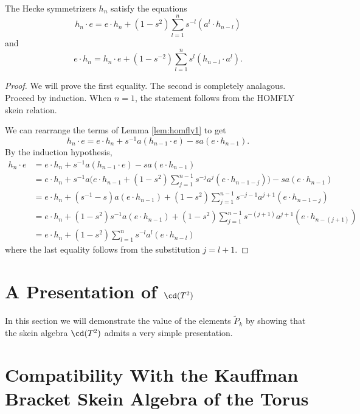 \begin{theorem} \label{prop:homfly2}
The Hecke symmetrizers $h_n$ satisfy the equations
\[
h_n \cdot e = e \cdot h_n + ( 1 - s^2 ) \sum_{l=1}^{n} s^{-l} ( a^l \cdot h_{n-l} )
\]
and
\[
e \cdot h_n = h_n \cdot e + (1 - s^{-2} ) \sum_{l=1}^{n} s^l ( h_{n-l} \cdot a^l ).
\]
\end{theorem}
\begin{proof}
We will prove the first equality. The second is completely analagous. Proceed by induction. When $n=1$, the statement follows from the HOMFLY skein relation. 

We can rearrange the terms of Lemma \ref{lem:homfly1} to get
\begin{equation} \label{eq:homfly1b}
h_n \cdot e = e \cdot h_n + s^{-1} a ( h_{n-1} \cdot e ) - s a ( e \cdot h_{n-1} ).
\end{equation}
By the induction hypothesis,
\begin{align*}
h_n \cdot e & = e \cdot h_n + s^{-1} a ( h_{n-1} \cdot e ) - s a ( e \cdot h_{n-1} ) \\
& = e \cdot h_n + s^{-1} a \Big( e \cdot h_{n-1} + ( 1 - s^2 ) \sum_{j=1}^{n-1} s^{-j} a^j ( e \cdot h_{n-1-j} ) \Big) - s a ( e \cdot h_{n-1} ) \\
& = e \cdot h_n + ( s^{-1} - s ) a ( e \cdot h_{n-1} ) + ( 1 - s^2 ) \sum_{j=1}^{n-1} s^{-j-1} a^{j+1} ( e \cdot h_{n-1-j} ) \\ 
& = e \cdot h_n + ( 1 - s^2 ) s^{-1} a ( e \cdot h_{n-1} ) + ( 1 - s^2 ) \sum_{j=1}^{n-1} s^{-(j+1)} a^{j+1} ( e \cdot h_{n-(j+1)} ) \\
&= e \cdot h_n + ( 1 - s^2 ) \sum_{l=1}^{n} s^{-l} a^{l} ( e \cdot h_{n-l} )
\end{align*}
where the last equality follows from the substitution $j=l+1$. 
\end{proof}


\section{A Presentation of $\cd(T^2)$}

In this section we will demonstrate the value of the elements $\tilde{P}_k$  by showing that the skein algebra $\cd(T^2)$ admits a very simple presentation. 



\section{Compatibility With the Kauffman Bracket Skein Algebra of the Torus}



